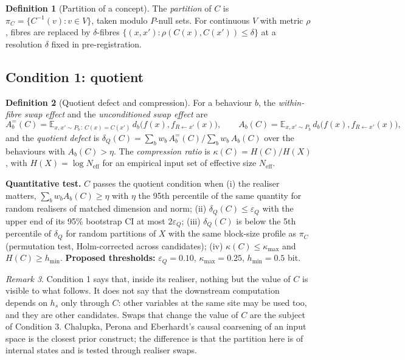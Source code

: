\documentclass[11pt]{article}
\theoremstyle{definition}
\newtheorem{definition}{Definition}[section]
\theoremstyle{plain}
\theoremstyle{remark}
\newtheorem{remark}[definition]{Remark}
\newcommand{\E}{\mathbb{E}}
\newcommand{\Hent}{H}
\newcommand{\Part}{\pi}
\begin{document}
\begin{definition}[Partition of a concept]
The \emph{partition} of $C$ is $\Part_C=\{C^{-1}(v):v\in V\}$, taken modulo
$P$-null sets. For continuous $V$ with metric $\rho$, fibres are replaced by
$\delta$-fibres $\{(x,x'):\rho(C(x),C(x'))\le\delta\}$ at a resolution
$\delta$ fixed in pre-registration.
\end{definition}

\subsection{Condition 1: quotient}

\begin{definition}[Quotient defect and compression]\label{def:quotient}
For a behaviour $b$, the \emph{within-fibre swap effect} and the
\emph{unconditioned swap effect} are
\[
A_b^{=}(C)=\E_{x,x'\sim P_b\,:\,C(x)=C(x')}\,
  d_b\bigl(f(x),f_{R\leftarrow x'}(x)\bigr),\qquad
A_b(C)=\E_{x,x'\sim P_b}\,
  d_b\bigl(f(x),f_{R\leftarrow x'}(x)\bigr),
\]
and the \emph{quotient defect} is
$\delta_Q(C)=\sum_b w_b\,A_b^{=}(C)\big/\sum_b w_b\,A_b(C)$ over the behaviours
with $A_b(C)>\eta$. The \emph{compression ratio} is
$\kappa(C)=\Hent(C)/\Hent(X)$, with $\Hent(X)=\log N_{\mathrm{eff}}$ for an
empirical input set of effective size $N_{\mathrm{eff}}$.
\end{definition}

\noindent\textbf{Quantitative test.} $C$ passes the quotient condition when
(i) the realiser matters, $\sum_b w_bA_b(C)\ge\eta$ with $\eta$ the
95th percentile of the same quantity for random realisers of matched
dimension and norm;
(ii) $\delta_Q(C)\le\varepsilon_Q$ with the upper end of its 95\% bootstrap CI
at most $2\varepsilon_Q$;
(iii) $\delta_Q(C)$ is below the 5th percentile of $\delta_Q$ for random
partitions of $X$ with the same block-size profile as $\Part_C$
(permutation test, Holm-corrected across candidates);
(iv) $\kappa(C)\le\kappa_{\max}$ and $\Hent(C)\ge h_{\min}$.
\textbf{Proposed thresholds:} $\varepsilon_Q=0.10$, $\kappa_{\max}=0.25$,
$h_{\min}=0.5$ bit.

\begin{remark}
Condition 1 says that, inside its realiser, nothing but the value of $C$ is
visible to what follows. It does not say that the downstream computation
depends on $h_s$ only through $C$: other variables at the same site may be
used too, and they are other candidates. Swaps that change the value of $C$
are the subject of Condition 3. Chalupka, Perona and Eberhardt's causal
coarsening of an input space is the closest prior construct; the difference is
that the partition here is of internal states and is tested through realiser
swaps.
\end{remark}
\end{document}
